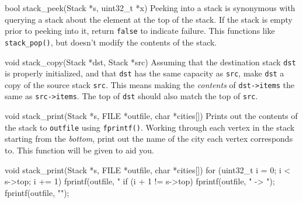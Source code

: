 \begin{funcdoc}{bool stack\_peek(Stack *s, uint32\_t *x)}
  Peeking into a stack is synonymous with querying a stack about the
  element at the top of the stack. If the stack is empty prior to
  peeking into it, return \texttt{false} to indicate failure. This
  functions like \texttt{stack\_pop()}, but doesn't modify the contents
  of the stack.
\end{funcdoc}

\begin{funcdoc}{void stack\_copy(Stack *dst, Stack *src)}
  Assuming that the destination stack \texttt{dst} is properly
  initialized, and that \texttt{dst} has the same capacity as
  \texttt{src}, make \texttt{dst} a copy of the source stack
  \texttt{src}. This means making the \emph{contents} of
  \texttt{dst->items} the same as \texttt{src->items}. The top of
  \texttt{dst} should also match the top of \texttt{src}.
\end{funcdoc}

\begin{funcdoc}{void stack\_print(Stack *s, FILE *outfile, char *cities[])}
  Prints out the contents of the stack to \texttt{outfile} using
  \texttt{fprintf()}. Working through each vertex in the stack starting
  from the \emph{bottom}, print out the name of the city each vertex
  corresponds to. This function will be given to aid you.

  \begin{clisting}{}
void stack_print(Stack *s, FILE *outfile, char *cities[]) {
    for (uint32_t i = 0; i < s->top; i += 1) {
        fprintf(outfile, "%
        if (i + 1 != s->top) {
            fprintf(outfile, " -> ");
        }
    }
    fprintf(outfile, "\n");
}
  \end{clisting}
\end{funcdoc}
